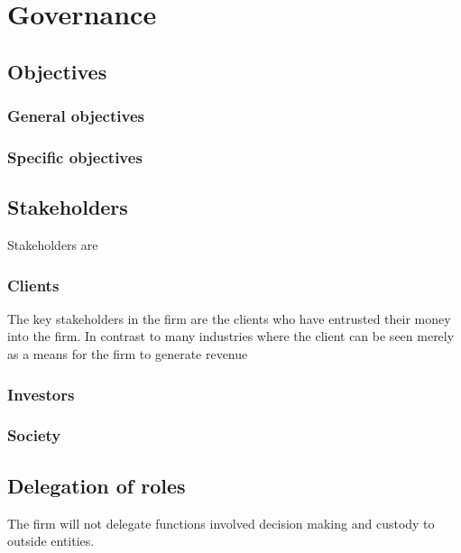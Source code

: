 \chapter{Governance}

\section{Objectives}

\subsection{General objectives}

\subsection{Specific objectives}

\section{Stakeholders}
Stakeholders are

\subsection{Clients}

The key stakeholders in the firm are the clients who have entrusted
their money into the firm.  In contrast to many industries where the
client can be seen merely as a means for the firm to generate revenue

\subsection{Investors}

\subsection{Society}

\section{Delegation of roles}

The firm will not delegate functions involved decision making and
custody to outside entities.


